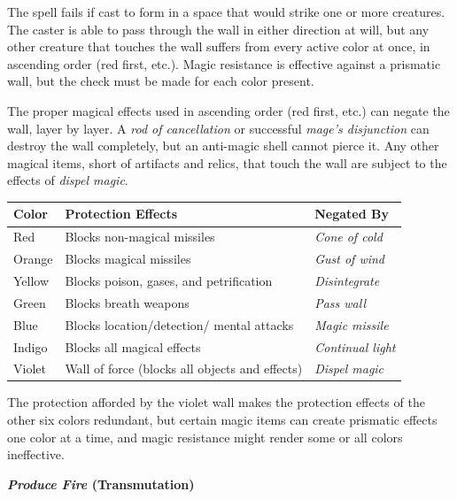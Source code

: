 \begin{multicols}{2}
The spell fails if cast to form in a space that would strike one or more creatures.  The caster is able to pass through the wall in either direction at will, but any other creature that touches the wall suffers from every active color at once, in ascending order (red first, etc.).  Magic resistance is effective against a prismatic wall, but the check must be made for each color present.

The proper magical effects used in ascending order (red first, etc.) can negate the wall, layer by layer.  A \textit{rod of cancellation} or successful \textit{mage's disjunction} can destroy the wall completely, but an anti-magic shell cannot pierce it.  Any other magical items, short of artifacts and relics, that touch the wall are subject to the effects of \textit{dispel magic}.

\noindent
\begin{tabular}{|p{}|p{}|p{}|}
\hline
Color	& Protection Effects	& Negated By \\
\hline\hline
\rowcolor[gray]{.9}Red	& Blocks non-magical missiles	& \textit{Cone of cold} \\
Orange	& Blocks magical missiles	& \textit{Gust of wind} \\
\rowcolor[gray]{.9}Yellow	& Blocks poison, gases, and petrification	& \textit{Disin\-tegrate} \\
Green	& Blocks breath weapons	& \textit{Pass wall} \\
\rowcolor[gray]{.9}Blue	& Blocks location/detection/ mental attacks	& \textit{Magic missile} \\
Indigo	& Blocks all magical effects	& \textit{Continual light} \\
\rowcolor[gray]{.9}Violet	& Wall of force (blocks all objects and effects)	& \textit{Dispel magic} \\
\hline
\end{tabular}

The protection afforded by the violet wall makes the protection effects of the other six colors redundant, but certain magic items can create prismatic effects one color at a time, and magic resistance might render some or all colors ineffective.

\vspace{1em}

\noindent
\begin{minipage}{\columnwidth}

\noindent \textbf{\textit{Produce Fire} (Transmutation)}


\end{minipage}
\end{multicols}
